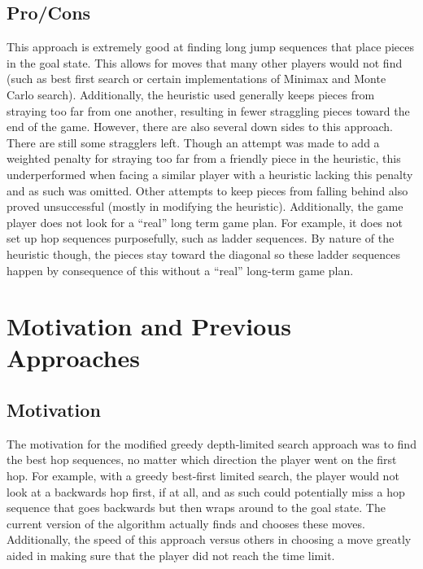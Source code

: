 \documentclass[paper=a4, fontsize=11pt]{scrartcl}
\numberwithin{equation}{section}		%
\numberwithin{figure}{section}			%
\numberwithin{table}{section}				%
\begin{document}
\subsection{Pro/Cons}
This approach is extremely good at finding long jump sequences that place pieces in the goal state. This allows for moves that many other players would not find (such as best first search or certain implementations of Minimax and Monte Carlo search). Additionally, the heuristic used generally keeps pieces from straying too far from one another, resulting in fewer straggling pieces toward the end of the game. However, there are also several down sides to this approach. There are still some stragglers left. Though an attempt was made to add a weighted penalty for straying too far from a friendly piece in the heuristic, this underperformed when facing a similar player with a heuristic lacking this penalty and as such was omitted. Other attempts to keep pieces from falling behind also proved unsuccessful (mostly in modifying the heuristic). Additionally, the game player does not look for a ``real'' long term game plan. For example, it does not set up hop sequences purposefully, such as ladder sequences. By nature of the heuristic though, the pieces stay toward the diagonal so these ladder sequences happen by consequence of this without a ``real'' long-term game plan.

\section{Motivation and Previous Approaches}
\subsection{Motivation}
The motivation for the modified greedy depth-limited search approach was to find the best hop sequences, no matter which direction the player went on the first hop. For example, with a greedy best-first limited search, the player would not look at a backwards hop first, if at all, and as such could potentially miss a hop sequence that goes backwards but then wraps around to the goal state. The current version of the algorithm actually finds and chooses these moves. Additionally, the speed of this approach versus others in choosing a move greatly aided in making sure that the player did not reach the time limit.
\end{document}
